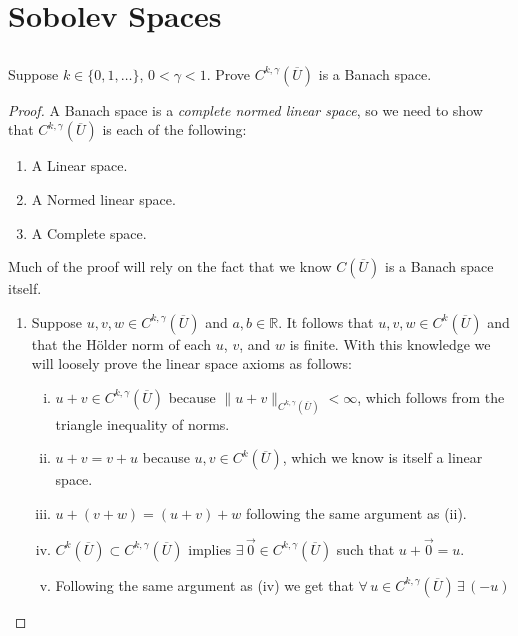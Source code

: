 \documentclass[11pt]{article}
\begin{document}
\pagestyle{fancy}
\fancyhead[L]{}
\fancyhead[R]{}
\tableofcontents
\newpage
\fancyhead[L]{\leftmark}
\fancyhead[R]{\rightmark}
\fancyhead[C]{}
\setcounter{section}{4}

\section{Sobolev Spaces}
\subsection{}
Suppose $k \in \{0,1,\dots\}$, $0 < \gamma < 1$. Prove $C^{k,\gamma}(\overline{U})$ is a Banach space.
\begin{proof}
A Banach space is a \textit{complete normed linear space}, so we need to show that $C^{k,\gamma}(\overline{U})$
is each of the following:
	\begin{enumerate}[1.]
		\item A Linear space.
		\item A Normed linear space.
		\item A Complete space.
	\end{enumerate}
Much of the proof will rely on the fact that we know $C(\overline{U})$ is a Banach space itself.
	\begin{enumerate}[1.]
		\item Suppose $u,v,w \in C^{k,\gamma}(\overline{U})$ and $a,b \in \mathbb{R}$.
			It follows that $u,v,w \in C^k(\overline{U})$ and that the H\"{o}lder norm of
			each $u$, $v$, and $w$ is finite. With this knowledge we will loosely prove
			the linear space axioms as follows:
			\begin{enumerate}[(i)]
				\item $u+v \in C^{k,\gamma}(\overline{U})$ because $\|u+v\|_{C^{k,\gamma}(\overline{U})} < \infty$,
					which follows from the triangle inequality of norms.
				\item $u+v = v+u$ because $u,v \in C^k(\overline{U})$, which we know is itself a linear space.
				\item $u+(v+w) = (u+v)+w$ following the same argument as (ii).
				\item $C^k(\overline{U}) \subset C^{k,\gamma}(\overline{U})$ implies $\exists \, \vec{0} \in C^{k,\gamma}(\overline{U})$
					such that $u + \vec{0} = u$.
				\item Following the same argument as (iv) we get that $\forall \, u \in C^{k,\gamma}(\overline{U}) \, \exists \, (-u)$

\end{enumerate}
\end{enumerate}
\end{proof}
\end{document}
